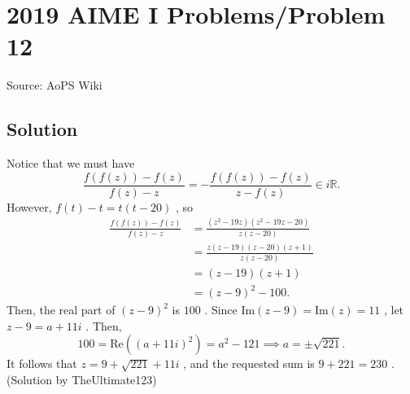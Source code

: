 \documentclass[12pt]{article}
\begin{document}
\section*{{2019 AIME I Problems/Problem 12}}
Source: AoPS Wiki

\subsection*{Solution}
Notice that we must have \[\frac{f(f(z))-f(z)}{f(z)-z}=-\frac{f(f(z))-f(z)}{z-f(z)}\in i\mathbb R .\] However, $f(t)-t=t(t-20)$ , so \begin{align*} \frac{f(f(z))-f(z)}{f(z)-z}&=\frac{(z^2-19z)(z^2-19z-20)}{z(z-20)}\\ &=\frac{z(z-19)(z-20)(z+1)}{z(z-20)}\\ &=(z-19)(z+1)\\ &=(z-9)^2-100. \end{align*} Then, the real part of $(z-9)^2$ is $100$ . Since $\text{Im}(z-9)=\text{Im}(z)=11$ , let $z-9=a+11i$ . Then, \[100=\text{Re}((a+11i)^2)=a^2-121\implies a=\pm\sqrt{221}.\] It follows that $z=9+\sqrt{221}+11i$ , and the requested sum is $9+221=\boxed{230}$ . (Solution by TheUltimate123)
\end{document}
